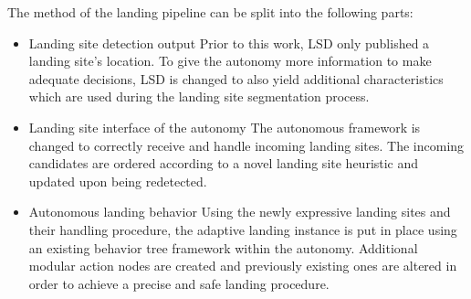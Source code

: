 The method of the landing pipeline can be split into the following parts:

\begin{itemize}
    \item Landing site detection output
    Prior to this work, LSD only published a landing site's location. To give the autonomy more information to make adequate decisions, LSD is changed to also yield additional characteristics which are used during the landing site segmentation process.
    \item Landing site interface of the autonomy
    The autonomous framework is changed to correctly receive and handle incoming landing sites. The incoming candidates are ordered according to a novel landing site heuristic and updated upon being redetected.
    \item Autonomous landing behavior
    Using the newly expressive landing sites and their handling procedure, the adaptive landing instance is put in place using an existing behavior tree framework within the autonomy. Additional modular action nodes are created and previously existing ones are altered in order to achieve a precise and safe landing procedure.
\end{itemize}
